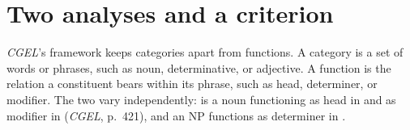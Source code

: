 %

\section{Two analyses and a criterion}\label{sec:analyses}

\textit{CGEL}'s framework keeps categories apart from functions. A category is a set of words or phrases, such as noun, determinative, or adjective. A function is the relation a constituent bears within its phrase, such as head, determiner, or modifier. The two vary independently:  is a noun functioning as head in  and as modifier in  (\textit{CGEL}, p.~421), and an NP functions as determiner in .

